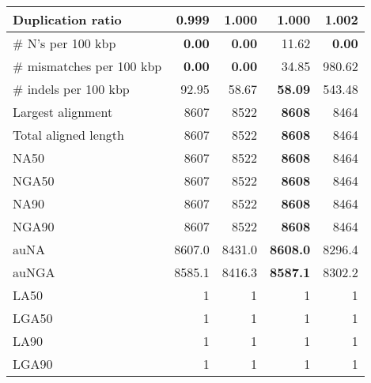 \documentclass[12pt,a4paper]{article}
\begin{document}
\begin{table}[ht]
\begin{center}
\begin{tabular}{|l*{4}{|r}|}
Duplication ratio & {\bf 0.999} & 1.000 & 1.000 & 1.002 \\ \hline
\# N's per 100 kbp & {\bf 0.00} & {\bf 0.00} & 11.62 & {\bf 0.00} \\ \hline
\# mismatches per 100 kbp & {\bf 0.00} & {\bf 0.00} & 34.85 & 980.62 \\ \hline
\# indels per 100 kbp & 92.95 & 58.67 & {\bf 58.09} & 543.48 \\ \hline
Largest alignment & 8607 & 8522 & {\bf 8608} & 8464 \\ \hline
Total aligned length & 8607 & 8522 & {\bf 8608} & 8464 \\ \hline
NA50 & 8607 & 8522 & {\bf 8608} & 8464 \\ \hline
NGA50 & 8607 & 8522 & {\bf 8608} & 8464 \\ \hline
NA90 & 8607 & 8522 & {\bf 8608} & 8464 \\ \hline
NGA90 & 8607 & 8522 & {\bf 8608} & 8464 \\ \hline
auNA & 8607.0 & 8431.0 & {\bf 8608.0} & 8296.4 \\ \hline
auNGA & 8585.1 & 8416.3 & {\bf 8587.1} & 8302.2 \\ \hline
LA50 & 1 & 1 & 1 & 1 \\ \hline
LGA50 & 1 & 1 & 1 & 1 \\ \hline
LA90 & 1 & 1 & 1 & 1 \\ \hline
LGA90 & 1 & 1 & 1 & 1 \\ \hline
\end{tabular}
\end{center}
\end{table}
\end{document}
